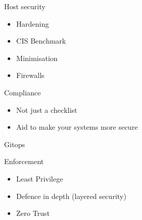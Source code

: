\documentclass{dcpresentation}
\begin{document}
\begin{frame}{Host security}
  \begin{itemize}
  \item Hardening
  \item CIS Benchmark
  \item Minimisation
  \item Firewalls
  \end{itemize}
\end{frame}


\begin{frame}{Compliance}
  \begin{itemize}
  \item Not just a checklist
  \item Aid to make your systems more secure 
  \end{itemize}
\end{frame}

\begin{frame}{Gitops}

\end{frame}

\begin{frame}{Enforcement}

\end{frame}

\begin{frame}
  \begin{itemize}
  \item Least Privilege
  \item Defence in depth (layered security)
  \item Zero Trust
  \end{itemize}
\end{frame}
\end{document}
